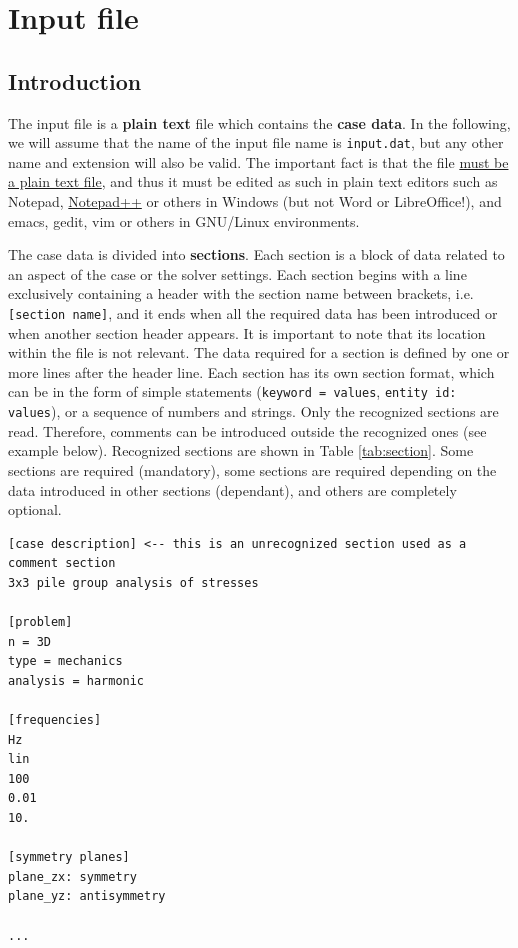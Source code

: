 \documentclass[a4paper,fleqn]{book}
\begin{document}
\chapter{Input file}

\label{ch:input_file}

\section{Introduction}

The input file is a \textbf{plain text} file which contains the \textbf{case data}. In the following, we will assume that the name of the input file name is \texttt{input.dat}, but any other name and extension will also be valid. The important fact is that the file \underline{must be a plain text file}, and thus it must be edited as such in plain text editors such as Notepad, \href{https://notepad-plus-plus.org/}{Notepad++} or others in Windows (but not Word or LibreOffice!), and emacs, gedit, vim or others in GNU/Linux environments.

The case data is divided into \textbf{sections}. Each section is a block of data related to an aspect of the case or the solver settings. Each section begins with a line exclusively containing a header with the section name between brackets, i.e. \texttt{[section name]}, and it ends when all the required data has been introduced or when another section header appears. It is important to note that its location within the file is not relevant. The data required for a section is defined by one or more lines after the header line. Each section has its own section format, which can be in the form of simple statements (\texttt{keyword = values}, \texttt{entity id: values}), or a sequence of numbers and strings. Only the recognized sections are read. Therefore, comments can be introduced outside the recognized ones (see example below). Recognized sections are shown in Table \ref{tab:section}. Some sections are required (mandatory), some sections are required depending on the data introduced in other sections (dependant), and others are completely optional.

\begin{Verbatim}[frame=single, fontsize=\small, label=input.dat]
[case description] <-- this is an unrecognized section used as a comment section
3x3 pile group analysis of stresses

[problem]
n = 3D
type = mechanics
analysis = harmonic

[frequencies]
Hz
lin
100
0.01
10.

[symmetry planes]
plane_zx: symmetry
plane_yz: antisymmetry

...
\end{Verbatim}
\end{document}
